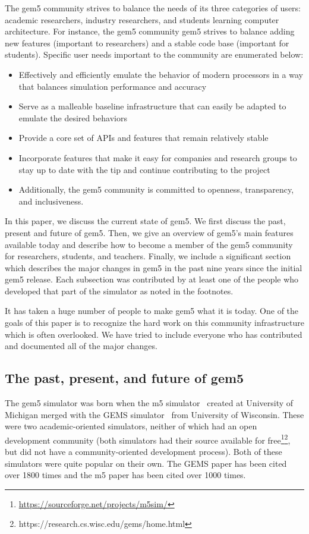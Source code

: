 The gem5 community strives to balance the needs of its three categories of users: academic researchers, industry researchers, and students learning computer architecture.
For instance, the gem5 community gem5 strives to balance adding new features (important to researchers) and a stable code base (important for students).
Specific user needs important to the community are enumerated below:
\begin{itemize}
    \item Effectively and efficiently emulate the behavior of modern processors in a way that balances simulation performance and accuracy
    \item Serve as a malleable baseline infrastructure that can easily be adapted to emulate the desired behaviors
    \item Provide a core set of APIs and features that remain relatively stable
    \item Incorporate features that make it easy for companies and research groups to stay up to date with the tip and continue contributing to the project
    \item Additionally, the gem5 community is committed to openness, transparency, and inclusiveness.
\end{itemize}

In this paper, we discuss the current state of gem5.
We first discuss the past, present and future of gem5.
Then, we give an overview of gem5's main features available today and describe how to become a member of the gem5 community for researchers, students, and teachers.
Finally, we include a significant section which describes the major changes in gem5 in the past nine years since the initial gem5 release.
Each subsection was contributed by at least one of the people who developed that part of the simulator as noted in the footnotes.

It has taken a huge number of people to make gem5 what it is today.
One of the goals of this paper is to recognize the hard work on this community infrastructure which is often overlooked.
We have tried to include everyone who has contributed and documented all of the major changes.

\subsection{The past, present, and future of gem5}

The gem5 simulator was born when the m5 simulator~\cite{BinkertDHLSR06} created at University of Michigan merged with the GEMS simulator~\cite{MartinSBMXAMHW05} from University of Wisconsin.
These were two academic-oriented simulators, neither of which had an open development community (both simulators had their source available for free\footnote{\url{https://sourceforge.net/projects/m5sim/}}\footnote{https://research.cs.wisc.edu/gems/home.html}, but did not have a community-oriented development process).
Both of these simulators were quite popular on their own.
The GEMS paper has been cited over 1800 times and the m5 paper has been cited over 1000 times.

